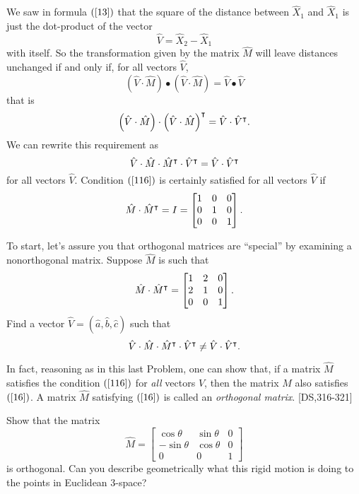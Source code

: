 \documentclass{ximera}
\begin{document}
We saw in formula $\left(  \ref{13}\right)  $ that the square of the distance
between $\hat{X}_{1}$ and $\hat{X}_{1}$ is just the dot-product of the vector%
\[
\hat{V}=\hat{X}_{2}-\hat{X}_{1}%
\]
with itself. So the transformation given by the matrix $\hat{M}$ will leave
distances unchanged if and only if, for all vectors $\hat{V}$,%
\[
\left(  \hat{V}  \cdot\hat{M} \right) \bullet\left(
\hat{V}  \cdot\hat{M}\right)  =\hat{V}\bullet\hat{V}%
\]
that is%
\[
\left( \hat{V}  \cdot\hat{M} \right) \cdot\left(
\hat{V}  \cdot\hat{M}\right)  ^\intercal=\hat{V}  \cdot
\hat{V}  ^\intercal.
\]
We can rewrite this requirement as%
\begin{equation}
\hat{V}  \cdot\hat{M}\cdot\hat{M}^\transpose\cdot  \hat
{V}  ^\transpose=\hat{V}  \cdot\hat{V}  ^\transpose
\label{116}%
\end{equation}
for all vectors $\hat{V}$. Condition $\left(  \ref{116}\right)  $ is certainly
satisfied for all vectors $\hat{V}$ if
\begin{equation}
\hat{M}\cdot\hat{M}^\transpose=I=\begin{bmatrix}
%
1 & 0 & 0\\
0 & 1 & 0\\
0 & 0 & 1
\end{bmatrix}
  . \label{16}%
\end{equation}


\begin{problem}
To start, let's assure you that orthogonal matrices are ``special'' by examining a nonorthogonal matrix. Suppose $\hat{M}$ is such that%
\[
\hat{M}\cdot\hat{M}^\intercal=\begin{bmatrix}
1 & 2 & 0\\
2 & 1 & 0\\
0 & 0 & 1
\end{bmatrix}.
\]
Find a vector $\hat{V}=\left(\hat{a},\hat{b},\hat{c}\right)  $ such that%
\[
\hat{V} \cdot\hat{M}\cdot\hat{M}^\intercal\cdot\hat{V}^\intercal\neq\hat{V}  \cdot\hat{V}
^\intercal.
\]

\end{problem}

In fact, reasoning as in this last Problem, one can show that, if a matrix
$\hat{M}$ satisfies the condition $\left(  \ref{116}\right)  $ for
\textit{all} vectors $\hat{V}$, then the matrix $\hat{M}$ also satisfies
$\left(  \ref{16}\right)  $. A matrix $\hat{M}$ satisfying $\left(
\ref{16}\right)  $ is called an \textit{orthogonal matrix}. [DS,316-321]

\begin{problem}
\label{14} Show that the matrix%
\[
\hat{M}=\begin{bmatrix}
\cos\theta & \sin\theta & 0\\
-\sin\theta & \cos\theta & 0\\
0 & 0 & 1
\end{bmatrix}
\]
is orthogonal. Can you describe geometrically what this rigid motion is doing
to the points in Euclidean $3$-space?
\end{problem}
\end{document}
